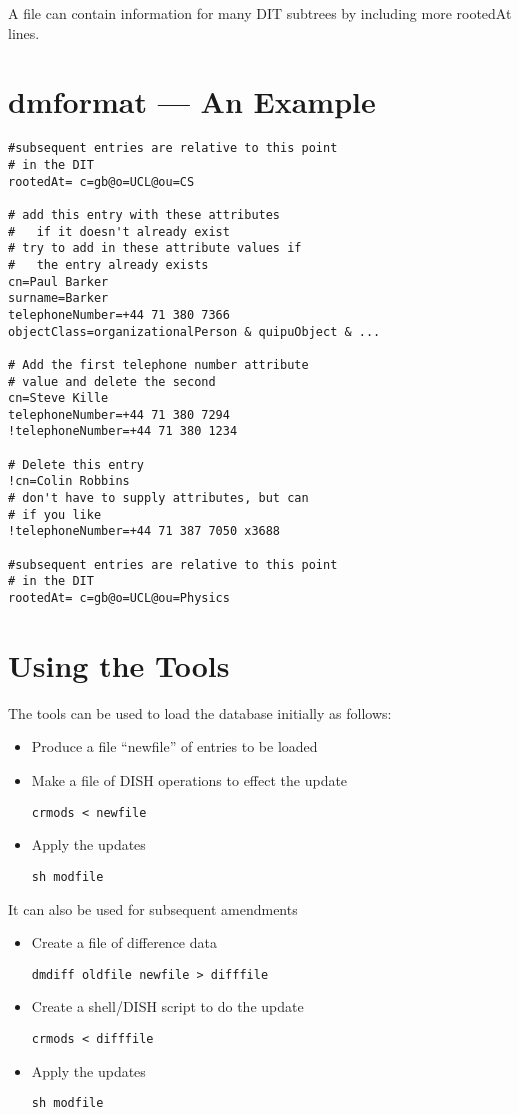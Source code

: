 A file can contain information for many DIT subtrees by including more
rootedAt lines.

\section{dmformat --- An Example}

\begin{verbatim}
#subsequent entries are relative to this point
# in the DIT
rootedAt= c=gb@o=UCL@ou=CS

# add this entry with these attributes
#   if it doesn't already exist
# try to add in these attribute values if
#   the entry already exists
cn=Paul Barker
surname=Barker
telephoneNumber=+44 71 380 7366
objectClass=organizationalPerson & quipuObject & ...

# Add the first telephone number attribute
# value and delete the second
cn=Steve Kille
telephoneNumber=+44 71 380 7294
!telephoneNumber=+44 71 380 1234

# Delete this entry
!cn=Colin Robbins
# don't have to supply attributes, but can
# if you like
!telephoneNumber=+44 71 387 7050 x3688

#subsequent entries are relative to this point
# in the DIT
rootedAt= c=gb@o=UCL@ou=Physics

\end{verbatim}

\section{Using the Tools}

The tools can be used to load the database initially as follows:

\begin{itemize}

\item Produce a file ``newfile'' of entries to be loaded
\item Make a file of DISH operations to effect the update

\verb|crmods < newfile|

\item Apply the updates

\verb|sh modfile|
\end{itemize}

It can also be used for subsequent amendments

\begin{itemize}
\item Create a file of difference data

\verb|dmdiff oldfile newfile > difffile|

\item Create a shell/DISH script to do the update

\verb|crmods < difffile|

\item Apply the updates

\verb|sh modfile|
\end{itemize}


